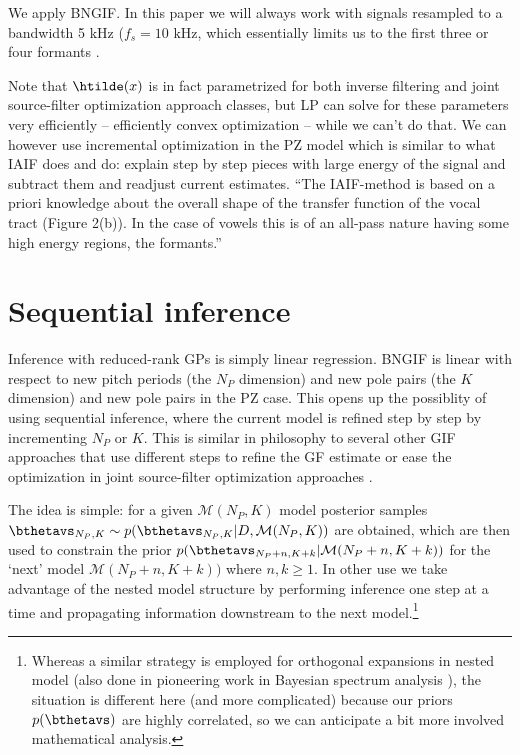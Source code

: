 \begin{chaptersections}{%
We apply BNGIF.
}
In this paper we will always work with signals resampled to a bandwidth 5 kHz ($f_s = \text{10 kHz}$, which essentially limits us to the first three {or} four formants \citep[p.~20]{Rabiner1993}.

Note that $\htilde(x)$ is in fact parametrized for both inverse filtering and joint source-filter optimization approach classes, but LP can solve for these parameters very efficiently -- efficiently convex optimization -- while we can't do that.
We can however use incremental optimization in the PZ model which is similar to what IAIF does and \citep{Bretthorst1989} do: explain step by step pieces with large energy of the signal and subtract them and readjust current estimates.
``The IAIF-method is based on a priori knowledge
about the overall shape of the transfer function of
the vocal tract (Figure 2(b)). In the case of vowels
this is of an all-pass nature having some high
energy regions, the formants.'' \citep{Alku1992}

\section{Sequential inference}


Inference with reduced-rank GPs is simply linear regression.
BNGIF is linear with respect to new pitch periods (the $N_P$ dimension) and new pole pairs (the $K$ dimension) and new pole pairs in the PZ case.
This opens up the possiblity of using sequential inference, where the current model is refined step by step by incrementing $N_P$ or $K$.
This is similar in philosophy to several other GIF approaches that use different steps to refine the GF estimate \citep[such as][]{Alku1992} or ease the optimization in joint source-filter optimization approaches \citep[for example,][]{Fu2006,Bleyer2017}.

The idea is simple:
for a given $\mathcal{M}(N_P,K)$ model posterior samples $\bthetavs_{N_P,K} \sim p(\bthetavs_{N_P,K}|D,\mathcal{M}(N_P,K))$ are obtained, which are then used to constrain the prior $p(\bthetavs_{N_P+n,K+k}|\mathcal{M}(N_P+n,K+k))$ for the `next' model $\mathcal{M}(N_P+n,K+k))$ where $n,k \geq 1$.
In other use we take advantage of the nested model structure by performing inference one step at a time and propagating information downstream to the next model.\footnote{%
Whereas a similar strategy is employed for orthogonal expansions in nested model \citep[][p.~472]{vonderLinden2014} (also done in pioneering work in Bayesian spectrum analysis \citep[][p.~73]{Bretthorst1988}), the situation is different here (and more complicated) because our priors $p(\bthetavs)$ are highly correlated, so we can anticipate a bit more involved mathematical analysis.
}


\end{chaptersections}
